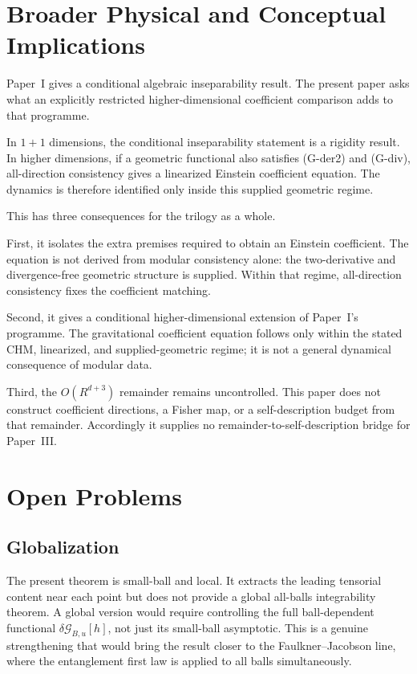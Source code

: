 \documentclass[12pt]{article}
\theoremstyle{definition}
\theoremstyle{remark}
\begin{document}
\section{Broader Physical and Conceptual Implications}\label{sec:7}

Paper~I\cite{PaperI} gives a conditional algebraic inseparability result.
The present paper asks what an explicitly restricted
higher-dimensional coefficient comparison adds to that programme.

In \(1+1\) dimensions, the conditional inseparability statement is a
rigidity result. In higher dimensions, if a geometric functional also
satisfies (G-der2) and (G-div), all-direction consistency gives a
linearized Einstein coefficient equation. The dynamics is therefore
identified only inside this supplied geometric regime.

This has three consequences for the trilogy as a whole.

First, it isolates the extra premises required to obtain an Einstein
coefficient. The equation is not derived from modular consistency alone:
the two-derivative and divergence-free geometric structure is supplied.
Within that regime, all-direction consistency fixes the coefficient
matching.

Second, it gives a conditional higher-dimensional extension of
Paper~I's programme. The gravitational coefficient equation follows
only within the stated CHM, linearized, and supplied-geometric regime;
it is not a general dynamical consequence of modular data.

Third, the \(O(R^{d+3})\) remainder remains uncontrolled. This paper
does not construct coefficient directions, a Fisher map, or a
self-description budget from that remainder. Accordingly it supplies no
remainder-to-self-description bridge for Paper~III.

\section{Open Problems}\label{sec:8}

\subsection{Globalization}\label{subsec:8.1}

The present theorem is small-ball and local. It extracts the leading tensorial content near each point but does not provide a global all-balls integrability theorem. A global version would require controlling the full ball-dependent functional \(\delta\mathcal{G}_{B,u}[h]\), not just its small-ball asymptotic. This is a genuine strengthening that would bring the result closer to the Faulkner\cite{Faulkner2014}--Jacobson\cite{Jacobson2016} line, where the entanglement first law is applied to all balls simultaneously.
\end{document}
